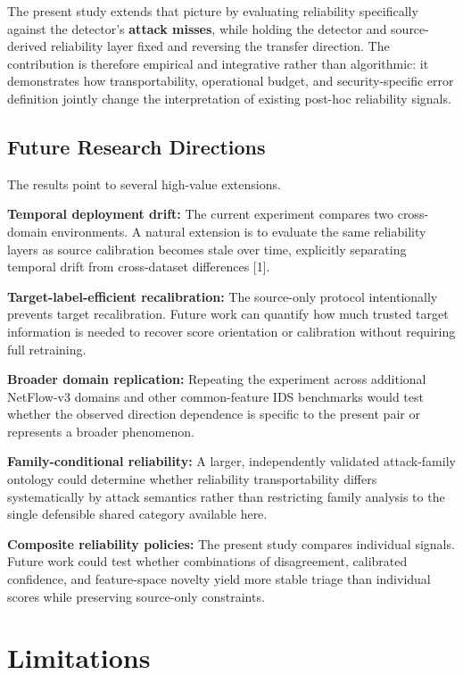 \documentclass[conference]{IEEEtran}
\begin{document}
The present study extends that picture by evaluating reliability specifically against the detector's \textbf{attack misses}, while holding the detector and source-derived reliability layer fixed and reversing the transfer direction. The contribution is therefore empirical and integrative rather than algorithmic: it demonstrates how transportability, operational budget, and security-specific error definition jointly change the interpretation of existing post-hoc reliability signals.

\subsection{Future Research Directions}

The results point to several high-value extensions.

\textbf{Temporal deployment drift:} The current experiment compares two cross-domain environments. A natural extension is to evaluate the same reliability layers as source calibration becomes stale over time, explicitly separating temporal drift from cross-dataset differences [1].

\textbf{Target-label-efficient recalibration:} The source-only protocol intentionally prevents target recalibration. Future work can quantify how much trusted target information is needed to recover score orientation or calibration without requiring full retraining.

\textbf{Broader domain replication:} Repeating the experiment across additional NetFlow-v3 domains and other common-feature IDS benchmarks would test whether the observed direction dependence is specific to the present pair or represents a broader phenomenon.

\textbf{Family-conditional reliability:} A larger, independently validated attack-family ontology could determine whether reliability transportability differs systematically by attack semantics rather than restricting family analysis to the single defensible shared category available here.

\textbf{Composite reliability policies:} The present study compares individual signals. Future work could test whether combinations of disagreement, calibrated confidence, and feature-space novelty yield more stable triage than individual scores while preserving source-only constraints.

\section{Limitations}
\end{document}
